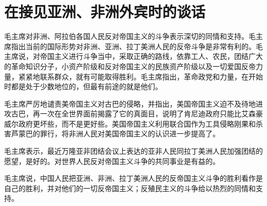 \section[在接见亚洲、非洲外宾时的谈话（一九六一年四月二十八日）]{在接见亚洲、非洲外宾时的谈话}

毛主席对非洲、阿拉伯各国人民反对帝国主义的斗争表示深切的同情和支持。毛主席指出当前的国际形势对非洲、亚洲、拉丁美洲人民的反帝斗争是非常有利的。毛主席说，对帝国主义进行斗争当中，采取正确的路线，依靠工人、农民，团结广大的革命知识分子，小资产阶级和反对帝国主义的民族资产阶级以及一切爱国反帝力量，紧紧地联系群众，就有可能取得胜利。毛主席指出，革命政党和力量，在开始时都是处于少数地位的，但最有前途的就是他们。

毛主席严厉地谴责美帝国主义对古巴的侵略，并指出，美国帝国主义迫不及待地进攻古巴，再一次在全世界面前揭露了它的真面目，说明了肯尼迪政府只能比艾森豪威尔政府更坏些，而不是更好些。美国帝国主义利用联合国作为工具侵略刚果和杀害芦蒙巴的罪行，将非洲人民对美国帝国主义的认识进一步提高了。

毛主席表示，最近万隆亚非团结会议上表达的亚非人民同拉丁美洲人民加强团结的愿望，是好的。对世界人民反对帝国主义斗争的共同事业是有益的。

毛主席说，中国人民把亚洲、非洲、拉丁美洲人民的反帝国主义斗争的胜利看作是自己的胜利，并对他们的一切反帝国主义；反殖民主义的斗争给以热烈的同情和支持。



